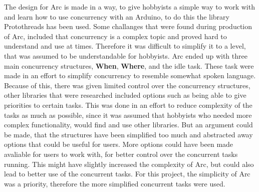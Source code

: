 The design for Arc is made in a way, to give hobbyists a simple way to work with and learn how to use concurrency with an Arduino, to do this the library Protothreads has been used. Some challanges that were found during production of Arc, included that concurrency is a complex topic and proved hard to understand and use at times. Therefore it was difficult to simplify it to a level, that was assumed to be understandable for hobbyists. Arc ended up with three main concurrency structures, \textbf{When}, \textbf{Where}, and the idle task. These task were made in an effort to simplify concurrency to resemble somewhat spoken language. Because of this, there was given limited control over the concurrency structures, other libraries that were researched included options such as being able to give priorities to certain tasks. This was done in an effort to reduce complexity of the tasks as much as possible, since it was assumed that hobbyists who needed more complex functionality, would find and use other libraries. But an argument could be made, that the structures have been simplified too much and abstracted away options that could be useful for users. More options could have been made avaliable for users to work with, for better control over the concurrent tasks running. This might have slightly increased the complexity of Arc, but could also lead to better use of the concurrent tasks. For this project, the simplicity of Arc was a priority, therefore the more simplified concurrent tasks were used. 



